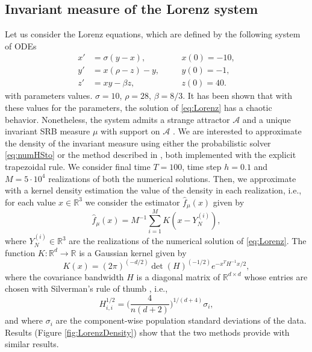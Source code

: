 \documentclass{siamart1116}
\numberwithin{theorem}{section}
\newcommand{\R}{\mathbb{R}}
\newcommand{\sksum}{\textstyle\sum}
\begin{document}
\subsection{Invariant measure of the Lorenz system} 
Let us consider the Lorenz equations, which are defined by the following system of ODEs
\begin{equation}\label{eq:Lorenz}
\begin{aligned}
	x' &= \sigma(y - x), \quad &&x(0) = -10,\\
	y' &= x(\rho - z) - y, \quad &&y(0) = -1,\\
	z' &= xy - \beta z, \quad &&z(0) = 40.
\end{aligned}
\end{equation}
with parameters values. $\sigma = 10$, $\rho = 28$, $\beta = 8/3$. It has been shown \cite{LOR63} that with these values for the parameters, the solution of \eqref{eq:Lorenz} has a chaotic behavior. Nonetheless, the system admits a strange attractor $\mathcal{A}$ and a {\color{red} unique invariant SRB measure $\mu$ with support on $\mathcal{A}$ \cite{Tuc99, HoM07}}. We are interested to approximate the density of the invariant measure using either the probabilistic solver \eqref{eq:numHSto} or the method described in \cite{CGS16}, both implemented with the explicit trapezoidal rule. We consider final time $T = 100$, time step $h = 0.1$ and $M = 5\cdot10^4$ realizations of both the numerical solutions. Then, we approximate with a kernel density estimation the value of the density in each realization, i.e., for each value $x \in \R^3$ we consider the estimator $\hat f_\mu(x)$ given by
\begin{equation}
	\hat f_\mu(x) = M^{-1}\sksum_{i=1}^{M} K(x - Y_N^{(i)}),
\end{equation}
where $Y_N^{(i)} \in \R^3$ are the realizations of the numerical solution of \eqref{eq:Lorenz}. The function $K\colon\R^d\to\R$ is a Gaussian kernel given by 
\begin{equation}
	K(x) = (2\pi)^{(-d/2)}\det(H)^{(-1/2)}e^{-x^TH^{-1}x/2},
\end{equation}
where the covariance bandwidth $H$ is a diagonal matrix of $\R^{d\times d}$ whose entries are chosen with Silverman's rule of thumb \cite{Sil86}, i.e.,
\begin{equation}
	H_{i,i}^{1/2} = \Big(\frac{4}{n(d + 2)}\Big) ^ {1 / (d + 4)} \sigma_i,
\end{equation}
and where $\sigma_i$ are the component-wise population standard deviations of the data. Results (Figure \ref{fig:LorenzDensity}) {\color{red} show} that the two methods provide with similar results.
\end{document}

